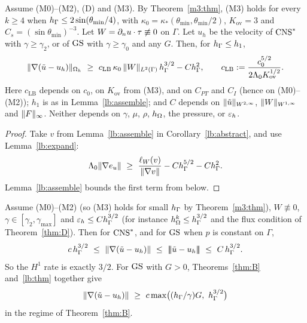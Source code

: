 \begin{theorem}\label{lb:thm}
Assume (M0)--(M2), (D) and (M3). By Theorem~\ref{m3:thm}, (M3) holds for every $k\ge4$ when $h_\Gamma\le2\sin(\theta_{\min}/4)$, with $\kappa_0=\kappa_\ast(\theta_{\min},\theta_{\min}/2)$, $K_{\mathrm{ov}}=3$ and $C_s=(\sin\theta_{\min})^{-3}$. Let $W=\partial_n u\cdot\tau\not\equiv0$ on $\Gamma$. Let $u_h$ be the velocity of $\mathrm{CNS}^\ast$ with $\gamma\ge\gamma_2$, or of $\mathrm{GS}$ with $\gamma\ge\gamma_0$ and any $G$. Then, for $h_\Gamma\le h_1$,
\[
\norm{\nabla(\ut-u_h)}_{\Oh}\ \ge\ c_{\mathrm{LB}}\,\kappa_0\,\norm{W}_{L^2(\Gamma)}\,\hG^{3/2}-C\hG^{2},\qquad c_{\mathrm{LB}}:=\frac{c_0^{5/2}}{2\Lambda_0K_{\mathrm{ov}}^{1/2}} .
\]
Here $c_{\mathrm{LB}}$ depends on $c_0$, on $K_{\mathrm{ov}}$ from (M3), and on $C_{PT}$ and $C_I$ (hence on (M0)--(M2)); $h_1$ is as in Lemma~\ref{lb:assemble}; and $C$ depends on $\lVert \tilde u\rVert_{W^{2,\infty}}$, $\lVert W\rVert_{W^{1,\infty}}$ and $\lVert F\rVert_\infty$. Neither depends on $\gamma$, $\mu$, $\rho$, $h_\Omega$, the pressure, or $\varepsilon_h$.
\end{theorem}

\begin{proof}
Take $v$ from Lemma~\ref{lb:assemble} in Corollary~\ref{lb:abstract}, and use Lemma~\ref{lb:expand}:
\[
\Lambda_0\norm{\nabla e_u}\ \ge\ \frac{\ell_W(v)}{\norm{\nabla v}}-C\hG^{5/2}-C\hG^2 .
\]
Lemma~\ref{lb:assemble} bounds the first term from below.
\end{proof}

\begin{corollary}[Sharpness of Theorem~\ref{thm:D} and of Theorem~\ref{thm:A} at $G=0$]\label{lb:cor}
Assume (M0)--(M2) (so (M3) holds for small $h_\Gamma$ by Theorem~\ref{m3:thm}), $W\not\equiv0$, $\gamma\in[\gamma_2,\gamma_{\max}]$ and $\varepsilon_h\le Ch_\Gamma^{3/2}$ (for instance $h_\Omega^k\le h_\Gamma^{3/2}$ and the flux condition of Theorem~\ref{thm:D}). Then for $\mathrm{CNS}^\ast$, and for $\mathrm{GS}$ when $p$ is constant on $\Gamma$,
\[
c\,\hG^{3/2}\ \le\ \norm{\nabla(\ut-u_h)}\ \le\ \tnorm{\ut-u_h}\ \le\ C\,\hG^{3/2}.
\]
So the $H^1$ rate is exactly $3/2$. For $\mathrm{GS}$ with $G>0$, Theorems~\ref{thm:B} and~\ref{lb:thm} together give
\[
\norm{\nabla(\ut-u_h)}\ \ge\ c\max\bigl((\hG/\gamma)G,\ \hG^{3/2}\bigr)
\]
in the regime of Theorem~\ref{thm:B}.
\end{corollary}

